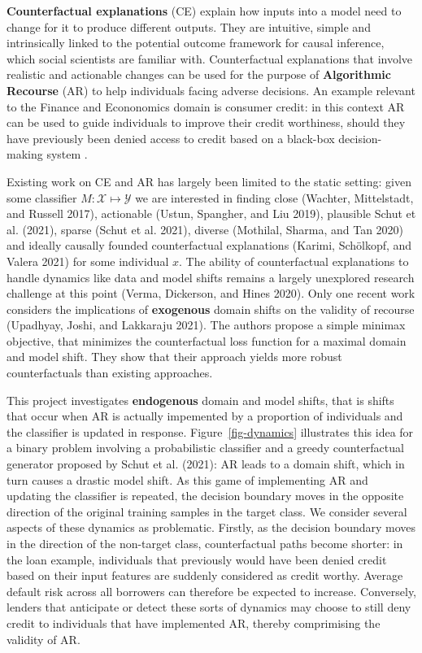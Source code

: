 \documentclass[
]{acmconf}
\begin{document}
\textbf{Counterfactual explanations} (CE) explain how inputs into a
model need to change for it to produce different outputs. They are
intuitive, simple and intrinsically linked to the potential outcome
framework for causal inference, which social scientists are familiar
with. Counterfactual explanations that involve realistic and actionable
changes can be used for the purpose of \textbf{Algorithmic Recourse}
(AR) to help individuals facing adverse decisions. An example relevant
to the Finance and Econonomics domain is consumer credit: in this
context AR can be used to guide individuals to improve their credit
worthiness, should they have previously been denied access to credit
based on a black-box decision-making system .

Existing work on CE and AR has largely been limited to the static
setting: given some classifier \(M: \mathcal{X} \mapsto \mathcal{Y}\) we
are interested in finding close (Wachter, Mittelstadt, and Russell
2017), actionable (Ustun, Spangher, and Liu 2019), plausible Schut et
al. (2021), sparse (Schut et al. 2021), diverse (Mothilal, Sharma, and
Tan 2020) and ideally causally founded counterfactual explanations
(Karimi, Schölkopf, and Valera 2021) for some individual \(x\). The
ability of counterfactual explanations to handle dynamics like data and
model shifts remains a largely unexplored research challenge at this
point (Verma, Dickerson, and Hines 2020). Only one recent work considers
the implications of \textbf{exogenous} domain shifts on the validity of
recourse (Upadhyay, Joshi, and Lakkaraju 2021). The authors propose a
simple minimax objective, that minimizes the counterfactual loss
function for a maximal domain and model shift. They show that their
approach yields more robust counterfactuals than existing approaches.

This project investigates \textbf{endogenous} domain and model shifts,
that is shifts that occur when AR is actually impemented by a proportion
of individuals and the classifier is updated in response.
Figure~\ref{fig-dynamics} illustrates this idea for a binary problem
involving a probabilistic classifier and a greedy counterfactual
generator proposed by Schut et al. (2021): AR leads to a domain shift,
which in turn causes a drastic model shift. As this game of implementing
AR and updating the classifier is repeated, the decision boundary moves
in the opposite direction of the original training samples in the target
class. We consider several aspects of these dynamics as problematic.
Firstly, as the decision boundary moves in the direction of the
non-target class, counterfactual paths become shorter: in the loan
example, individuals that previously would have been denied credit based
on their input features are suddenly considered as credit worthy.
Average default risk across all borrowers can therefore be expected to
increase. Conversely, lenders that anticipate or detect these sorts of
dynamics may choose to still deny credit to individuals that have
implemented AR, thereby comprimising the validity of AR.
\end{document}
